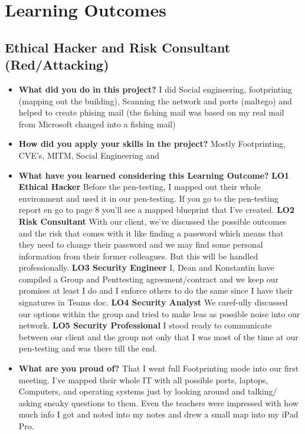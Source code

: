 \documentclass[12pt, letterpaper]{article}
\begin{document}
\newpage
\section{Learning Outcomes}
\subsection{Ethical Hacker and Risk Consultant (Red/Attacking)}
\begin{itemize}
\item \textbf{What did you do in this project?}
\hfill\break
I did Social engineering, footprinting (mapping out the building), Scanning the network and ports (maltego) and helped to create phising mail (the fishing mail was based on my real mail from Microsoft changed into a fishing mail)
\item \textbf{How did you apply your skills in the project?}
\hfill\break
\hfill\break
Mostly Footprinting, CVE's, MITM, Social Engineering and 
\item \textbf{What have you learned considering this Learning Outcome?}
\break
\textbf{LO1 Ethical Hacker}
\hfill\break
Before the pen-testing, I mapped out their whole environment and used it in our pen-testing.
\hfill\break
\hfill\break
If you go to the pen-testing report en go to page 8 you'll see a mapped blueprint that I've created.
\hfill\break
\textbf{LO2 Risk Consultant}
\hfill\break
With our client, we've discussed the possible outcomes and the risk that comes with it like finding a password which means that they need to change their password and we may find some personal information from their former colleagues. But this will be handled professionally.
\hfill\break
\textbf{LO3 Security Engineer}
\hfill\break
I, Dean and Konstantin have compiled a Group and Penttesting agreement/contract and we keep our promises at least I do and I enforce others to do the same since I have their signatures in Teams doc.
\hfill\break
\textbf{LO4 Security Analyst}
\hfill\break
We caref-ully discussed our options within the group and tried to make leas as possible noise into our network.
\hfill\break
\textbf{LO5 Security Professional}
\hfill\break
I stood ready to communicate between our client and the group not only that I was most of the time at our pen-testing and was there till the end.
\item \textbf{What are you proud of?}
\hfill\break
That I went full Footprinting mode into our first meeting. I've mapped their whole IT with all possible ports, laptops, Computers, and operating systems just by looking around and talking/ asking sneaky questions to them. Even the teachers were impressed with how much info I got and noted into my notes and drew a small map into my iPad Pro.

\end{itemize}
\end{document}
